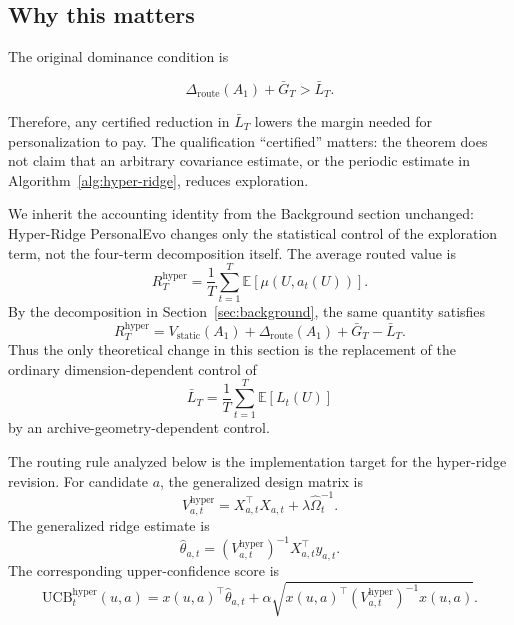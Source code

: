 \documentclass{article} %
\providecommand{\Droute}{\Delta_{\mathrm{route}}}
\begin{document}
\subsection{Why this matters}

The original dominance condition is

\[
\Droute(A_1) + \bar{G}_T > \bar{L}_T .
\]

Therefore, any certified reduction in $\bar L_T$ lowers the margin needed for
personalization to pay. The qualification ``certified'' matters: the theorem
does not claim that an arbitrary covariance estimate, or the periodic estimate
in Algorithm~\ref{alg:hyper-ridge}, reduces exploration.




We inherit the accounting identity from the Background section unchanged: Hyper-Ridge PersonalEvo changes only the statistical control of the exploration term, not the four-term decomposition itself. The average routed value is
\begin{equation}
\label{eq:hyper-routed-value}
R_T^{\mathrm{hyper}}
=
\frac{1}{T}\sum_{t=1}^{T}
\mathbb{E}\!\left[\mu(U,a_t(U))\right].
\end{equation}
By the decomposition in Section~\ref{sec:background}, the same quantity satisfies
\begin{equation}
\label{eq:hyper-inherited-decomp}
R_T^{\mathrm{hyper}}
=
V_{\mathrm{static}}(A_1)
+
\Delta_{\mathrm{route}}(A_1)
+
\bar G_T
-
\bar L_T.
\end{equation}
Thus the only theoretical change in this section is the replacement of the ordinary dimension-dependent control of
\begin{equation}
\label{eq:hyper-barl}
\bar L_T
=
\frac{1}{T}\sum_{t=1}^{T}\mathbb{E}[L_t(U)]
\end{equation}
by an archive-geometry-dependent control.

The routing rule analyzed below is the implementation target for the hyper-ridge revision. For candidate \(a\), the generalized design matrix is
\begin{equation}
\label{eq:hyper-design}
V_{a,t}^{\mathrm{hyper}}
=
X_{a,t}^{\top}X_{a,t}
+
\lambda \widehat{\Omega}_t^{-1}.
\end{equation}
The generalized ridge estimate is
\begin{equation}
\label{eq:hyper-theta-hat}
\widehat{\theta}_{a,t}
=
\left(V_{a,t}^{\mathrm{hyper}}\right)^{-1}
X_{a,t}^{\top}y_{a,t}.
\end{equation}
The corresponding upper-confidence score is
\begin{equation}
\label{eq:hyper-ucb}
\mathrm{UCB}_{t}^{\mathrm{hyper}}(u,a)
=
x(u,a)^{\top}\widehat{\theta}_{a,t}
+
\alpha
\sqrt{
x(u,a)^{\top}
\left(V_{a,t}^{\mathrm{hyper}}\right)^{-1}
x(u,a)
}.
\end{equation}
\end{document}

